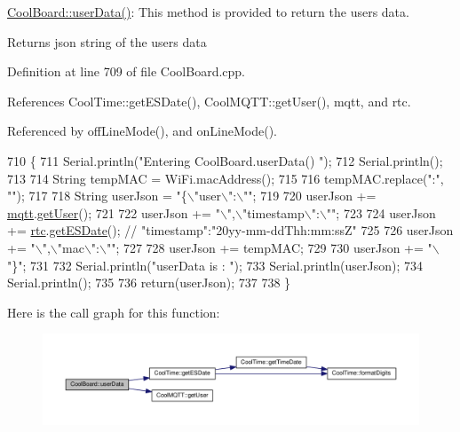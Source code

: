 \hyperlink{classCoolBoard_ae7358fb6e623cfc81b775f5f1734909b}{Cool\+Board\+::user\+Data()}\+: This method is provided to return the user\textquotesingle{}s data.

\begin{DoxyReturn}{Returns}
json string of the user\textquotesingle{}s data 
\end{DoxyReturn}


Definition at line 709 of file Cool\+Board.\+cpp.



References Cool\+Time\+::get\+E\+S\+Date(), Cool\+M\+Q\+T\+T\+::get\+User(), mqtt, and rtc.



Referenced by off\+Line\+Mode(), and on\+Line\+Mode().


\begin{DoxyCode}
710 \{
711     Serial.println(\textcolor{stringliteral}{"Entering CoolBoard.userData() "});
712     Serial.println();
713 
714     String tempMAC = WiFi.macAddress();
715 
716     tempMAC.replace(\textcolor{stringliteral}{":"}, \textcolor{stringliteral}{""});
717 
718     String userJson = \textcolor{stringliteral}{"\{\(\backslash\)"user\(\backslash\)":\(\backslash\)""};
719 
720     userJson += \hyperlink{classCoolBoard_a2399f44d7c23c1149a335cb3b46d90f1}{mqtt}.\hyperlink{classCoolMQTT_a373cc92fca7760d886f02d8a6e5b3f63}{getUser}();
721 
722     userJson += \textcolor{stringliteral}{"\(\backslash\)",\(\backslash\)"timestamp\(\backslash\)":\(\backslash\)""};
723 
724     userJson += \hyperlink{classCoolBoard_a50d2a6716879d64a85f3c6b44ad63275}{rtc}.\hyperlink{classCoolTime_ac4f32ee513c1328d984306645e8785a4}{getESDate}(); \textcolor{comment}{// "timestamp":"20yy-mm-ddThh:mm:ssZ"}
725 
726     userJson += \textcolor{stringliteral}{"\(\backslash\)",\(\backslash\)"mac\(\backslash\)":\(\backslash\)""};
727 
728     userJson += tempMAC;
729 
730     userJson += \textcolor{stringliteral}{"\(\backslash\)"\}"};
731     
732     Serial.println(\textcolor{stringliteral}{"userData is : "});
733     Serial.println(userJson);
734     Serial.println();   
735     
736     \textcolor{keywordflow}{return}(userJson);
737     
738 \}
\end{DoxyCode}
Here is the call graph for this function\+:
\nopagebreak
\begin{figure}[H]
\begin{center}
\leavevmode
\includegraphics[width=350pt]{classCoolBoard_ae7358fb6e623cfc81b775f5f1734909b_cgraph}
\end{center}
\end{figure}
